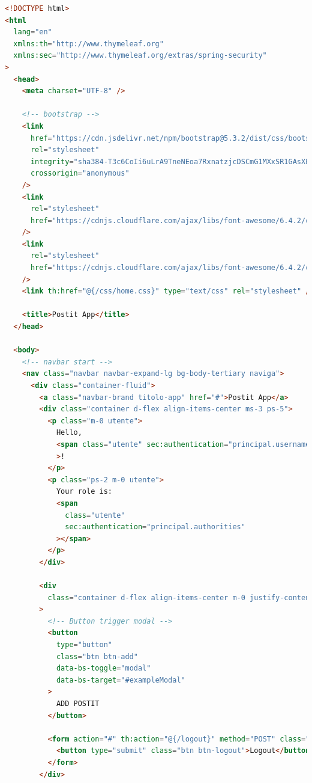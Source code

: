 \begin{lstlisting}[language=html,basicstyle=\tiny, caption={postit-home.html}, captionpos=b]
<!DOCTYPE html>
<html
  lang="en"
  xmlns:th="http://www.thymeleaf.org"
  xmlns:sec="http://www.thymeleaf.org/extras/spring-security"
>
  <head>
    <meta charset="UTF-8" />

    <!-- bootstrap -->
    <link
      href="https://cdn.jsdelivr.net/npm/bootstrap@5.3.2/dist/css/bootstrap.min.css"
      rel="stylesheet"
      integrity="sha384-T3c6CoIi6uLrA9TneNEoa7RxnatzjcDSCmG1MXxSR1GAsXEV/Dwwykc2MPK8M2HN"
      crossorigin="anonymous"
    />
    <link
      rel="stylesheet"
      href="https://cdnjs.cloudflare.com/ajax/libs/font-awesome/6.4.2/css/all.min.css"
    />
    <link
      rel="stylesheet"
      href="https://cdnjs.cloudflare.com/ajax/libs/font-awesome/6.4.2/css/all.min.css"
    />
    <link th:href="@{/css/home.css}" type="text/css" rel="stylesheet" />

    <title>Postit App</title>
  </head>

  <body>
    <!-- navbar start -->
    <nav class="navbar navbar-expand-lg bg-body-tertiary naviga">
      <div class="container-fluid">
        <a class="navbar-brand titolo-app" href="#">Postit App</a>
        <div class="container d-flex align-items-center ms-3 ps-5">
          <p class="m-0 utente">
            Hello,
            <span class="utente" sec:authentication="principal.username"></span
            >!
          </p>
          <p class="ps-2 m-0 utente">
            Your role is:
            <span
              class="utente"
              sec:authentication="principal.authorities"
            ></span>
          </p>
        </div>

        <div
          class="container d-flex align-items-center m-0 justify-content-end"
        >
          <!-- Button trigger modal -->
          <button
            type="button"
            class="btn btn-add"
            data-bs-toggle="modal"
            data-bs-target="#exampleModal"
          >
            ADD POSTIT
          </button>

          <form action="#" th:action="@{/logout}" method="POST" class="ps-3">
            <button type="submit" class="btn btn-logout">Logout</button>
          </form>
        </div>


\end{lstlisting}
